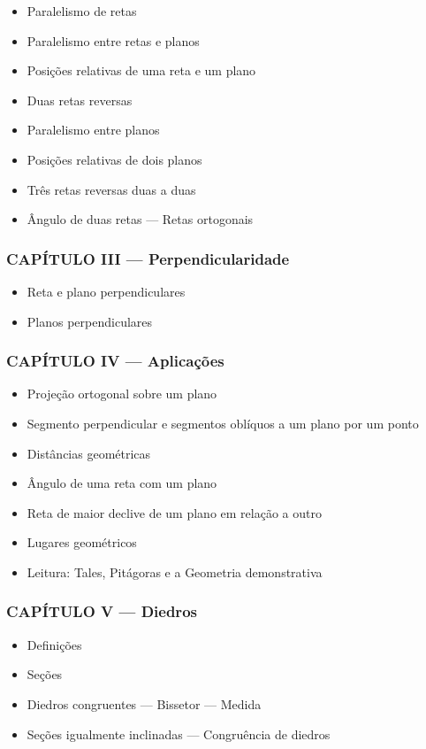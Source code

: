 \documentclass[a4paper,12pt]{article}[abntex2]
\begin{document}
\begin{itemize}
\item Paralelismo de retas
\item Paralelismo entre retas e planos
\item Posições relativas de uma reta e um plano
\item Duas retas reversas
\item Paralelismo entre planos
\item Posições relativas de dois planos
\item Três retas reversas duas a duas
\item Ângulo de duas retas — Retas ortogonais
\end{itemize}
\subsubsection*{CAPÍTULO III — Perpendicularidade}

\begin{itemize}
\item Reta e plano perpendiculares
\item Planos perpendiculares
\end{itemize}
\subsubsection*{CAPÍTULO IV — Aplicações}

\begin{itemize}
\item Projeção ortogonal sobre um plano
\item Segmento perpendicular e segmentos oblíquos a um plano por um ponto
\item Distâncias geométricas
\item Ângulo de uma reta com um plano
\item Reta de maior declive de um plano em relação a outro
\item Lugares geométricos
\item Leitura: Tales, Pitágoras e a Geometria demonstrativa
\end{itemize}
\subsubsection*{CAPÍTULO V — Diedros}

\begin{itemize}
\item Definições
\item Seções
\item Diedros congruentes — Bissetor — Medida
\item Seções igualmente inclinadas — Congruência de diedros
\end{itemize}
\end{document}
